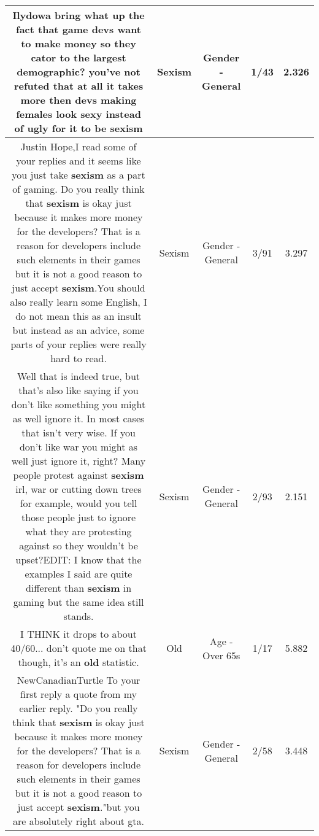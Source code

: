 \documentclass[11pt]{article}
\newlength\mylength
\begin{document}
\begin{center}
\begin{longtable}{|C{.65\mylength}|C{.30\mylength}|C{.12\mylength}|C{.12\mylength}|C{.12\mylength}|}
  \small Ilydowa bring what up the fact that game devs want to make money so they cator to the largest demographic? you've not refuted that at all it takes more then devs making females look sexy instead of ugly for it to be sexism\normalsize   & Sexism & Gender - General & 1/43 & 2.326 \\  \hline
  \small Justin Hope,I read some of your replies and it seems like you just take \textbf{sexism} as a part of gaming. Do you really think that \textbf{sexism} is okay just because it makes more money for the developers? That is a reason for developers include such elements in their games but it is not a good reason to just accept \textbf{sexism}.You should also really learn some English, I do not mean this as an insult but instead as an advice, some parts of your replies were really hard to read.\normalsize   & Sexism & Gender - General & 3/91 & 3.297 \\  \hline
  \small Well that is indeed true, but that's also like saying if you don't like something you might as well ignore it. In most cases that isn't very wise. If you don't like war you might as well just ignore it, right? Many people protest against \textbf{sexism} irl, war or cutting down trees for example, would you tell those people just to ignore what they are protesting against so they wouldn't be upset?EDIT: I know that the examples I said are quite different than \textbf{sexism} in gaming but the same idea still stands.\normalsize   & Sexism & Gender - General & 2/93 & 2.151 \\  \hline
  \small I THINK it drops to about 40/60... don't quote me on that though, it's an \textbf{old} statistic.\normalsize   & Old & Age - Over 65s & 1/17 & 5.882 \\  \hline
  \small NewCanadianTurtle To your first reply a quote from my earlier reply. "Do you really think that \textbf{sexism} is okay just because it makes more money for the developers? That is a reason for developers include such elements in their games but it is not a good reason to just accept \textbf{sexism}."but you are absolutely right about gta.\normalsize   & Sexism & Gender - General & 2/58 & 3.448 \\  \hline

\end{longtable}
\end{center}
\end{document}
